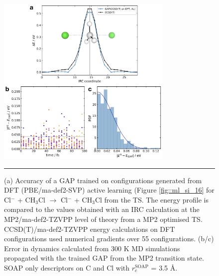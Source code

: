 \documentclass[../../main.tex]{subfiles}
\begin{document}
\begin{figure}[h!]
	\vspace{0.4cm}
	\centering
	\includegraphics[width=0.75\textwidth]{6/gap/figs_si/fig17}
	\vspace{0.2cm}
	\hrule
	\caption{(a) Accuracy of a GAP trained on configurations generated from DFT (PBE/ma-def2-SVP) active learning (Figure \ref{fig::ml_si_16} for Cl${}^{-}$ + CH${}_{3}$Cl $\rightarrow$ Cl${}^{-}$ + CH${}_{3}$Cl from the TS. The energy profile is compared to the values obtained with an IRC calculation at the MP2/ma-def2-TZVPP level of theory from a MP2 optimised TS. CCSD(T)/ma-def2-TZVPP energy calculations on DFT configurations used numerical gradients over 55 configurations. (b/c) Error in dynamics calculated from 300 K MD simulations propagated with the trained GAP from the MP2 transition state. SOAP only descriptors on C and Cl with $r_c^\text{SOAP}$ = 3.5 \AA.}
	\label{fig::ml_si_17}
\end{figure}
\end{document}
